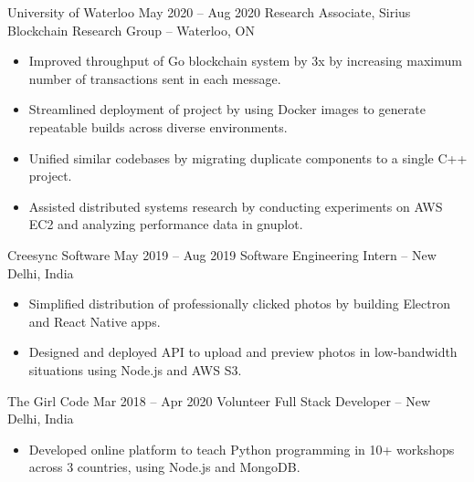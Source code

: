 \documentclass{article}
\begin{document}
\iffalse
Accelerated research in the field of Byzantine fault tolerant distributed computing, by implementing security features (like BLS signature verification), streamlining build and deployment of project using Docker, and reducing technical debt by standardizing use of external dependencies. Conducted performance benchmarks on AWS and analyzed performance data using gnuplot and Python.
\fi
\WorkEntry
{University of Waterloo}
{May 2020 -- Aug 2020}
{Research Associate, Sirius Blockchain Research Group -- Waterloo, ON}
{\begin{itemize} \itemsep -1pt
    \item Improved throughput of Go blockchain system by 3x by increasing maximum number of transactions sent in each message.
    \item Streamlined deployment of project by using Docker images to generate repeatable builds across diverse environments.
    \item Unified similar codebases by migrating duplicate components to a single  C++ project.
    \item Assisted distributed systems research by conducting experiments on AWS EC2 and analyzing performance data in gnuplot.
    \end{itemize}}
\vspace{1mm}
\iffalse
Designed and build native apps for professional photographers to deliver photos to clients, using Electron and React Native, and created API to preview uploaded photos in low-bandwidth situations, using Node.js and AWS S3. Reduced technical debt in React Native project by combining similar functionality into reusable components.
\fi
\WorkEntry
{Creesync Software}
{May 2019 -- Aug 2019}
{Software Engineering Intern -- New Delhi, India}
{\begin{itemize} \itemsep -1pt
    \item Simplified distribution of professionally clicked photos by building Electron and React Native apps.
    \item Designed and deployed API to upload and preview photos in low-bandwidth situations using Node.js and AWS S3.
    \end{itemize}}
\vspace{1mm}
\WorkEntry
{The Girl Code}
{Mar 2018 -- Apr 2020}
{Volunteer Full Stack Developer -- New Delhi, India}
{\begin{itemize} \itemsep -1pt
	\item Developed online platform to teach Python programming in 10+ workshops across 3 countries, using Node.js and MongoDB.
    \end{itemize}}
\end{document}
